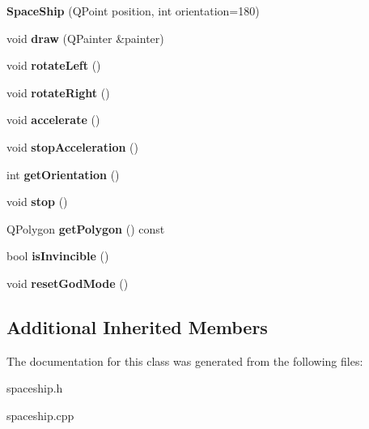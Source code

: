 \begin{DoxyCompactItemize}
\item 
\hypertarget{classSpaceShip_adbc4de15943ec4e773fb4aa2c7af80d7}{{\bfseries Space\-Ship} (Q\-Point position, int orientation=180)}\label{classSpaceShip_adbc4de15943ec4e773fb4aa2c7af80d7}

\item 
\hypertarget{classSpaceShip_af818580ba0af92e9d2fc802062cb4230}{void {\bfseries draw} (Q\-Painter \&painter)}\label{classSpaceShip_af818580ba0af92e9d2fc802062cb4230}

\item 
\hypertarget{classSpaceShip_ab22ffc09f85aedf98631a95fe1dff50d}{void {\bfseries rotate\-Left} ()}\label{classSpaceShip_ab22ffc09f85aedf98631a95fe1dff50d}

\item 
\hypertarget{classSpaceShip_aaeee70ef27051a1113ce68def76f5a3e}{void {\bfseries rotate\-Right} ()}\label{classSpaceShip_aaeee70ef27051a1113ce68def76f5a3e}

\item 
\hypertarget{classSpaceShip_ace0da5ec860ed1fa8aafaa3e6c00dcdd}{void {\bfseries accelerate} ()}\label{classSpaceShip_ace0da5ec860ed1fa8aafaa3e6c00dcdd}

\item 
\hypertarget{classSpaceShip_ac1503d09ed0843352b9ac749a1614bff}{void {\bfseries stop\-Acceleration} ()}\label{classSpaceShip_ac1503d09ed0843352b9ac749a1614bff}

\item 
\hypertarget{classSpaceShip_a257ea4b0622608577d6158274b8eb7c3}{int {\bfseries get\-Orientation} ()}\label{classSpaceShip_a257ea4b0622608577d6158274b8eb7c3}

\item 
\hypertarget{classSpaceShip_a59618f15c166a31a38b9f303fa060bb1}{void {\bfseries stop} ()}\label{classSpaceShip_a59618f15c166a31a38b9f303fa060bb1}

\item 
\hypertarget{classSpaceShip_a641a7f1558eba1082b76e356923adabc}{Q\-Polygon {\bfseries get\-Polygon} () const }\label{classSpaceShip_a641a7f1558eba1082b76e356923adabc}

\item 
\hypertarget{classSpaceShip_ad0a5b483b3da04c809364b0ff6fbb2da}{bool {\bfseries is\-Invincible} ()}\label{classSpaceShip_ad0a5b483b3da04c809364b0ff6fbb2da}

\item 
\hypertarget{classSpaceShip_ad16e8b430cd9fe8a7c81e6f167986c58}{void {\bfseries reset\-God\-Mode} ()}\label{classSpaceShip_ad16e8b430cd9fe8a7c81e6f167986c58}

\end{DoxyCompactItemize}
\subsection*{Additional Inherited Members}


The documentation for this class was generated from the following files\-:\begin{DoxyCompactItemize}
\item 
spaceship.\-h\item 
spaceship.\-cpp\end{DoxyCompactItemize}
